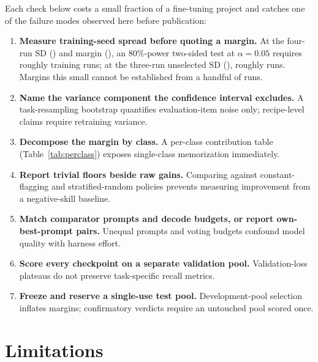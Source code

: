 \documentclass[11pt]{article}
\begin{document}
Each check below costs a small fraction of a fine-tuning project and catches one of the failure modes observed here before publication:
\begin{enumerate}\setlength\itemsep{1pt}\setlength\parskip{0pt}
\item \textbf{Measure training-seed spread before quoting a margin.} At the four-run SD (\rwSD{}) and margin (\margin{}), an 80\%-power two-sided test at $\alpha = 0.05$ requires roughly \seedsNeeded{} training runs; at the three-run unselected SD (\rwFreshSD{}), roughly \seedsNeededFresh{} runs. Margins this small cannot be established from a handful of runs.
\item \textbf{Name the variance component the confidence interval excludes.} A task-resampling bootstrap quantifies evaluation-item noise only; recipe-level claims require retraining variance.
\item \textbf{Decompose the margin by class.} A per-class contribution table (Table~\ref{tab:perclass}) exposes single-class memorization immediately.
\item \textbf{Report trivial floors beside raw gains.} Comparing against constant-flagging and stratified-random policies prevents measuring improvement from a negative-skill baseline.
\item \textbf{Match comparator prompts and decode budgets, or report own-best-prompt pairs.} Unequal prompts and voting budgets confound model quality with harness effort.
\item \textbf{Score every checkpoint on a separate validation pool.} Validation-loss plateaus do not preserve task-specific recall metrics.
\item \textbf{Freeze and reserve a single-use test pool.} Development-pool selection inflates margins; confirmatory verdicts require an untouched pool scored once.
\end{enumerate}

\section{Limitations}
\label{sec:limits}
\end{document}
